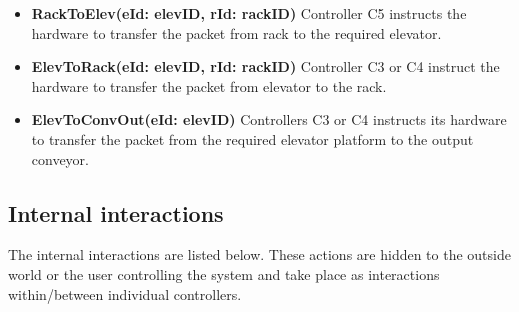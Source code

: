 \begin{itemize}
\item \textbf{RackToElev(eId: elevID, rId: rackID)}
Controller C5 instructs the hardware to transfer the packet from rack to the required elevator.

\item \textbf{ElevToRack(eId: elevID, rId: rackID)}
Controller C3 or C4 instruct the hardware to transfer the packet from elevator to the rack.

\item \textbf{ElevToConvOut(eId: elevID)}
Controllers C3 or C4 instructs its hardware to transfer the packet from the required elevator platform to the output conveyor.

\end{itemize}

\subsection*{Internal interactions}
The internal interactions are listed below. These actions are hidden to the outside world or the user controlling the system and take place as interactions within/between individual controllers.

